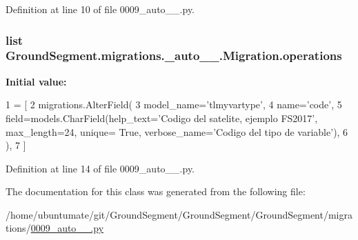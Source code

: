 Definition at line 10 of file 0009\+\_\+auto\+\_\+\_.\+py.

\hypertarget{class_ground_segment_1_1migrations_1_10009__auto__20161126__1856_1_1_migration_ae563dfbc8e83e838014acc3cc1b3b304}{}
\subsubsection[{operations}]{\setlength{\rightskip}{0pt plus 5cm}list Ground\+Segment.\+migrations.\+\_\+auto\+\_\+\_.\+Migration.\+operations\hspace{0.3cm}{\ttfamily [static]}}\label{class_ground_segment_1_1migrations_1_10009__auto__20161126__1856_1_1_migration_ae563dfbc8e83e838014acc3cc1b3b304}
{\bfseries Initial value\+:}
\begin{DoxyCode}
1 = [
2         migrations.AlterField(
3             model\_name=\textcolor{stringliteral}{'tlmyvartype'},
4             name=\textcolor{stringliteral}{'code'},
5             field=models.CharField(help\_text=\textcolor{stringliteral}{'Codigo del satelite, ejemplo FS2017'}, max\_length=24, unique=\textcolor{keyword}{
      True}, verbose\_name=\textcolor{stringliteral}{'Codigo del tipo de variable'}),
6         ),
7     ]
\end{DoxyCode}


Definition at line 14 of file 0009\+\_\+auto\+\_\+\_.\+py.



The documentation for this class was generated from the following file\+:\begin{DoxyCompactItemize}
\item 
/home/ubuntumate/git/\+Ground\+Segment/\+Ground\+Segment/\+Ground\+Segment/migrations/\hyperlink{0009__auto__20161126__1856_8py}{0009\+\_\+auto\+\_\+\_.\+py}\end{DoxyCompactItemize}
